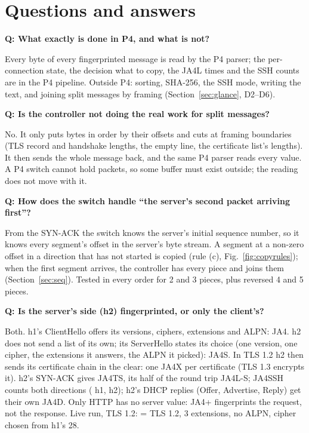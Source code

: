 \section{Questions and answers}
\label{sec:faq}

\newcommand{\qa}[2]{\par\noindent\textbf{Q: #1}\par\noindent #2\par\medskip}

\qa{What exactly is done in P4, and what is not?}{Every byte of every fingerprinted message is read by the P4
parser; the per-connection state, the decision what to copy, the JA4L times and the SSH counts are in the P4
pipeline. Outside P4: sorting, SHA-256, the SSH mode, writing the text, and joining split messages by framing
(Section~\ref{sec:glance}, D2--D6).}

\qa{Is the controller not doing the real work for split messages?}{No. It only puts bytes in order by their offsets
and cuts at framing boundaries (TLS record and handshake lengths, the empty line, the certificate list's lengths). It
then sends the whole message back, and the same P4 parser reads every value. A P4 switch cannot hold packets, so
some buffer must exist outside; the reading does not move with it.}

\qa{How does the switch handle ``the server's second packet arriving first''?}{From the SYN-ACK the switch knows the
server's initial sequence number, so it knows every segment's offset in the server's byte stream. A segment at a
non-zero offset in a direction that has not started is copied (rule (c), Fig.~\ref{fig:copyrules}); when the first
segment arrives, the controller has every piece and joins them (Section~\ref{sec:seq}). Tested in every order for 2
and 3 pieces, plus reversed 4 and 5 pieces.}

\qa{Is the server's side (h2) fingerprinted, or only the client's?}{Both. h1's ClientHello offers its versions,
ciphers, extensions and ALPN: JA4. h2 does not send a list of its own; its ServerHello states its choice (one
version, one cipher, the extensions it answers, the ALPN it picked): JA4S. In TLS 1.2 h2 then sends its certificate
chain in the clear: one JA4X per certificate (TLS 1.3 encrypts it). h2's SYN-ACK gives JA4TS, its half of the round
trip JA4L-S; JA4SSH counts both directions (\code{c\ldots} h1, \code{s\ldots} h2); h2's DHCP replies (Offer,
Advertise, Reply) get their own JA4D. Only HTTP has no server value: JA4+ fingerprints the request, not the
response. Live run, TLS 1.2: \code{t120300\_c030\_460f64128655} = TLS 1.2, 3 extensions, no ALPN, cipher
\code{c030} chosen from h1's 28.}

